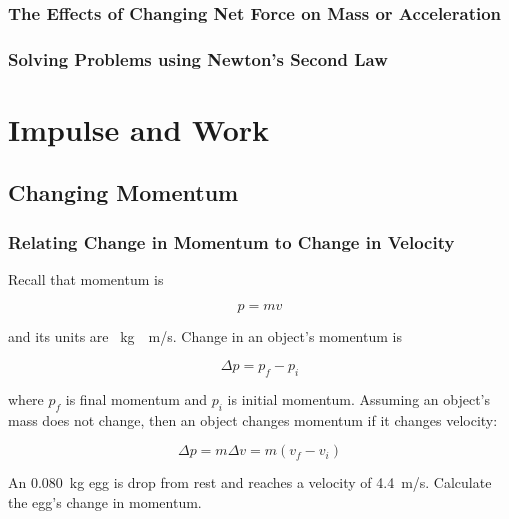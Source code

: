 \documentclass[dvipsnames]{article}
\newif\ifShowUnitIV                              %
\begin{document}
\subsubsection{The Effects of Changing Net Force on Mass or Acceleration}

\subsubsection{Solving Problems using Newton's Second Law}

\clearpage

\fi

\section{Impulse and Work}

\ifShowUnitIV
\setcounter{example}{0}

\subsection{Changing Momentum}

\subsubsection{Relating Change in Momentum to Change in Velocity}

Recall that momentum is
 
\begin{equation*}
    p = m v
\end{equation*}

and its units are \SI{}{kg\cdot m/s}. Change in an object's momentum is 

\begin{equation*}
    \Delta p = p_f - p_i
\end{equation*}

where $p_f$ is final momentum and $p_i$ is initial momentum. Assuming an object's mass does not change, then an object changes momentum if it changes velocity:

\begin{equation*}
    \Delta p = m \Delta v = m(v_f - v_i)
\end{equation*}

\begin{example}
An \SI{0.080}{kg} egg is drop from rest and reaches a velocity of \SI{4.4}{m/s}. Calculate the egg's change in momentum.
\end{example}
\end{document}
